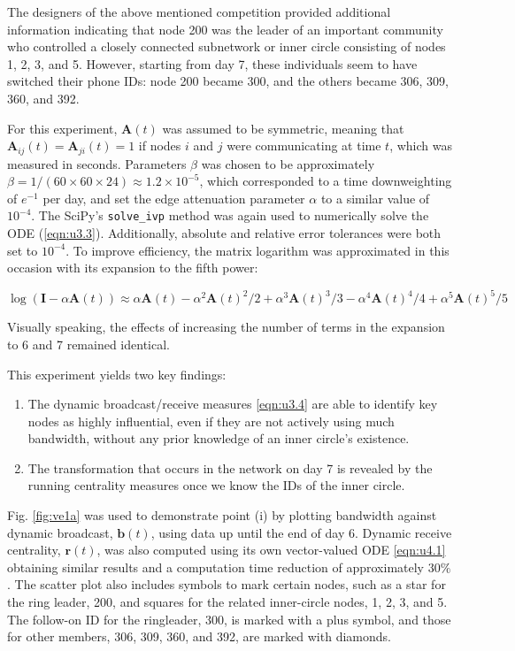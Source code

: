 The designers of the above mentioned competition provided additional information indicating that node 200 was the leader of an important community who controlled a closely connected subnetwork or inner circle consisting of nodes 1, 2, 3, and 5. However, starting from day 7, these individuals seem to have switched their phone IDs: node 200 became 300, and the others became 306, 309, 360, and 392.

For this experiment, $\mathbf{A}(t)$ was assumed to be symmetric, meaning that $\mathbf{A}_{ij}(t) = \mathbf{A}_{ji}(t) = 1$ if nodes $i$ and $j$ were communicating at time $t$, which was measured in seconds. Parameters $\beta$ was chosen to be approximately $\beta = 1/(60\times 60 \times 24) \approx 1.2 \times 10^{-5}$, which corresponded to a time downweighting of $e^{-1}$ per day, and set the edge attenuation parameter $\alpha$ to a similar value of $10^{-4}$. The SciPy's \texttt{solve\_ivp} method was again used to numerically solve the ODE (\ref{eqn:u3.3}). Additionally, absolute and relative error tolerances were both set to $10^{-4}$. To improve efficiency, the matrix logarithm was approximated in this occasion with its expansion to the fifth power:

$$\log(\mathbf{I} - \alpha \mathbf{A}(t)) \approx \alpha \mathbf{A}(t) - \alpha^2 \mathbf{A}(t)^2/2 + \alpha^3 \mathbf{A}(t)^3/3 - \alpha^4 \mathbf{A}(t)^4/4 + \alpha^5 \mathbf{A}(t)^5/5$$ 

Visually speaking, the effects of increasing the number of terms in the expansion to 6 and 7 remained identical.

This experiment yields two key findings:
\begin{enumerate}[label=(\roman*)]
  \item The dynamic broadcast/receive measures \eqref{eqn:u3.4} are able to identify key nodes as highly influential, even if they are not actively using much bandwidth, without any prior knowledge of an inner circle's existence.
  \item The transformation that occurs in the network on day 7 is revealed by the running centrality measures once we know the IDs of the inner circle.
\end{enumerate}

Fig. \ref{fig:ve1a} was used to demonstrate point (i) by plotting bandwidth against dynamic broadcast, $\mathbf{b}(t)$, using data up until the end of day 6. Dynamic receive centrality, $\mathbf{r}(t)$, was also computed using its own vector-valued ODE \eqref{eqn:u4.1} obtaining similar results and a computation time reduction of approximately $30\%$. The scatter plot also includes symbols to mark certain nodes, such as a star for the ring leader, 200, and squares for the related inner-circle nodes, 1, 2, 3, and 5. The follow-on ID for the ringleader, 300, is marked with a plus symbol, and those for other members, 306, 309, 360, and 392, are marked with diamonds.

